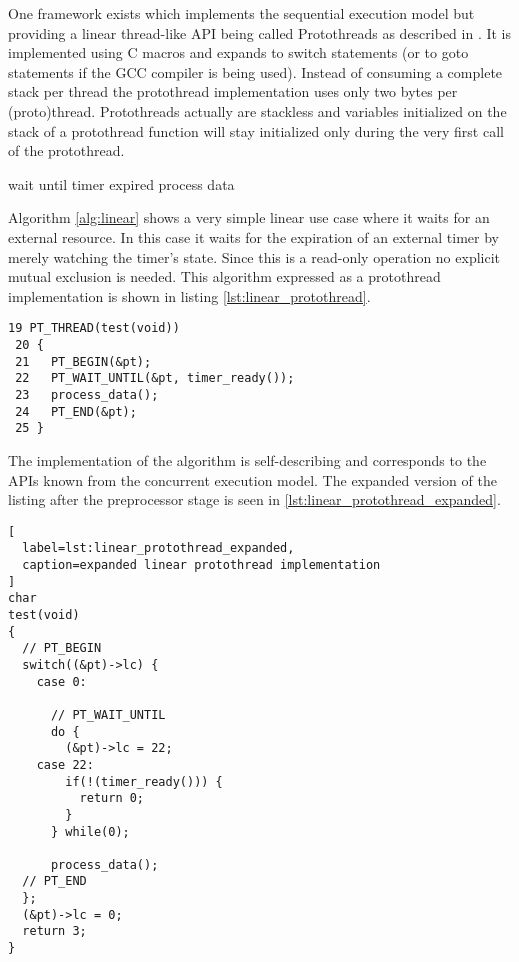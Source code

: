 One framework exists which implements the sequential execution model but providing a linear thread-like API being called Protothreads as described in \cite{dunkels}. It is implemented using C macros and expands to switch statements (or to goto statements if the GCC compiler is being used). Instead of consuming a complete stack per thread the protothread implementation uses only two bytes per (proto)thread. Protothreads actually are stackless and variables initialized on the stack of a protothread function will stay initialized only during the very first call of the protothread.

\begin{algorithm}[H]
\caption{Simple linear algorithm}
\label{alg:linear}
\begin{algorithmic}
    \STATE wait until timer expired
    \STATE process data
\ENDWHILE
\end{algorithmic}
\end{algorithm}

Algorithm \ref{alg:linear} shows a very simple linear use case where it waits for an external resource. In this case it waits for the expiration of an external timer by merely watching the timer's state. Since this is a read-only operation no explicit mutual exclusion is needed. This algorithm expressed as a protothread implementation is shown in listing \ref{lst:linear_protothread}.

\begin{lstlisting}[label=lst:linear_protothread,caption=linear protothread implementation]
 19 PT_THREAD(test(void))
 20 {
 21   PT_BEGIN(&pt);
 22   PT_WAIT_UNTIL(&pt, timer_ready());
 23   process_data();
 24   PT_END(&pt);
 25 }
\end{lstlisting}

The implementation of the algorithm is self-describing and corresponds to the APIs known from the concurrent execution model. The expanded version of the listing after the preprocessor stage is seen in \ref{lst:linear_protothread_expanded}.

\begin{lstlisting}[
  label=lst:linear_protothread_expanded,
  caption=expanded linear protothread implementation
]
char
test(void)
{
  // PT_BEGIN
  switch((&pt)->lc) {
    case 0:

      // PT_WAIT_UNTIL
      do {
        (&pt)->lc = 22;
    case 22:
        if(!(timer_ready())) {
          return 0;
        }
      } while(0);

      process_data();
  // PT_END
  };
  (&pt)->lc = 0;
  return 3;
}
\end{lstlisting}

